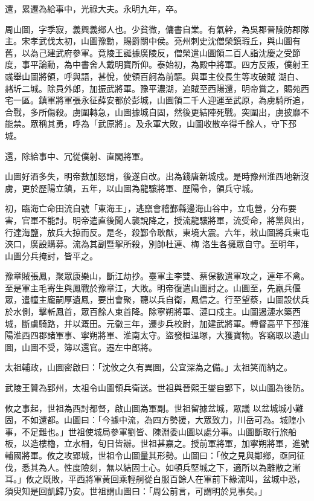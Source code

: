 \begin{pinyinscope}
 還，累遷為給事中，光祿大夫。永明九年，卒。



 周山圖，字季寂，義興義鄉人也。少貧微，傭書自業。有氣幹，為吳郡晉陵防郡隊主。宋孝武伐太初，山圖豫勳，賜爵關中侯。兗州刺史沈僧榮鎮瑕丘，與山圖有舊，以為己建武府參軍。竟陵王誕據廣陵反，僧榮遣山圖領二百人詣沈慶之受節度，事平論勳，為中書舍人戴明寶所仰。泰始初，為殿中將軍。四方反叛，僕射王彧舉山圖將領，呼與語，甚悅，使領百舸為前驅。與軍主佼長生等攻破賊
 湖白、赭圻二城。除員外郎，加振武將軍。豫平濃湖，追賊至西陽還，明帝賞之，賜苑西宅一區。鎮軍將軍張永征薛安都於彭城，山圖領二千人迎運至武原，為虜騎所追，合戰，多所傷殺。虜圍轉急，山圖據城自固，然後更結陣死戰。突圍出，虜披靡不能禁。眾稱其勇，呼為「武原將」。及永軍大敗，山圖收散卒得千餘人，守下邳城。



 還，除給事中、冗從僕射、直閣將軍。



 山圖好酒多失，明帝數加怒誚，後遂自改。出為錢唐新城戍。是時豫州淮西地新沒虜，更於歷陽立鎮，五年，以山圖為龍驤將軍、歷陽令，領兵守城。



 初，臨海亡命田流自號「東海王」，逃竄會稽鄞縣邊海山谷中，立屯營，分布要害，官軍不能討。明帝遣直後聞人襲說降之，授流龍驤將軍，流受命，將黨與出，行達海鹽，放兵大掠而反。是冬，殺鄞令耿猷，東境大震。六年，敕山圖將兵東屯浹口，廣設購募。流為其副暨挐所殺，別帥杜連、梅
 洛生各擁眾自守。至明年，山圖分兵掩討，皆平之。



 豫章賊張鳳，聚眾康樂山，斷江劫抄。臺軍主李雙、蔡保數遣軍攻之，連年不禽。至是軍主毛寄生與鳳戰於豫章江，大敗。明帝復遣山圖討之。山圖至，先羸兵偃眾，遣幢主龐嗣厚遺鳳，要出會聚，聽以兵自衛，鳳信之。行至望蔡，山圖設伏兵於水側，擊斬鳳首，眾百餘人束首降。除寧朔將軍、漣口戍主。山圖遏漣水築西城，斷虜騎路，并以溉田。元徽三年，遷步兵校尉，加建武將軍。轉督高平下邳淮陽淮西四郡諸軍事、寧朔將軍、淮南太守。盜發桓溫塚，大獲寶物。客竊取以遺山圖，山圖不受，簿以還官。遷左中郎將。



 太祖輔政，山圖密啟曰：「沈攸之久有異圖，公宜深為之備。」太祖笑而納之。



 武陵王贊為郢州，太祖令山圖領兵衛送。世祖與晉熙王燮自郢下，以山圖為後防。



 攸之事起，世祖為西討都督，啟山圖為軍副。世祖留據盆城，眾議
 以盆城城小難固，不如還都。山圖曰：「今據中流，為四方勢援，大眾致力，川岳可為。城隍小事，不足難也。」世祖使城局參軍劉皆、陳淵委山圖以處分事。山圖斷取行旅船板，以造樓櫓，立水柵，旬日皆辦。世祖甚嘉之。授前軍將軍，加寧朔將軍，進號輔國將軍。攸之攻郢城，世祖令山圖量其形勢。山圖曰：「攸之見與鄰鄉，亟同征伐，悉其為人。性度險刻，無以結固士心。如頓兵堅城之下，適所以為離散之漸耳。」攸之既敗，平西將軍黃回乘輕舸從白服百餘人在軍前下緣流叫，盆城中恐，須臾知是回凱歸乃安。世祖謂山圖曰：「周公前言，可謂明於見事矣。」




\end{pinyinscope}
